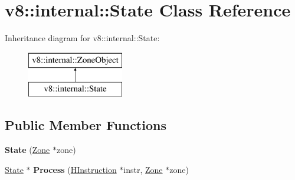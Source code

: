 \hypertarget{classv8_1_1internal_1_1_state}{}\section{v8\+:\+:internal\+:\+:State Class Reference}
\label{classv8_1_1internal_1_1_state}
Inheritance diagram for v8\+:\+:internal\+:\+:State\+:\begin{figure}[H]
\begin{center}
\leavevmode
\includegraphics[height=2.000000cm]{classv8_1_1internal_1_1_state}
\end{center}
\end{figure}
\subsection*{Public Member Functions}
\begin{DoxyCompactItemize}
\item 
{\bfseries State} (\hyperlink{classv8_1_1internal_1_1_zone}{Zone} $\ast$zone)\hypertarget{classv8_1_1internal_1_1_state_a9073e7e20a71bfd62fe96a3cefeee4eb}{}\label{classv8_1_1internal_1_1_state_a9073e7e20a71bfd62fe96a3cefeee4eb}

\item 
\hyperlink{classv8_1_1internal_1_1_state}{State} $\ast$ {\bfseries Process} (\hyperlink{classv8_1_1internal_1_1_h_instruction}{H\+Instruction} $\ast$instr, \hyperlink{classv8_1_1internal_1_1_zone}{Zone} $\ast$zone)\hypertarget{classv8_1_1internal_1_1_state_ada96dfe0c2aa4eb2f48b5c58f43aa0fc}{}\label{classv8_1_1internal_1_1_state_ada96dfe0c2aa4eb2f48b5c58f43aa0fc}

\end{DoxyCompactItemize}
